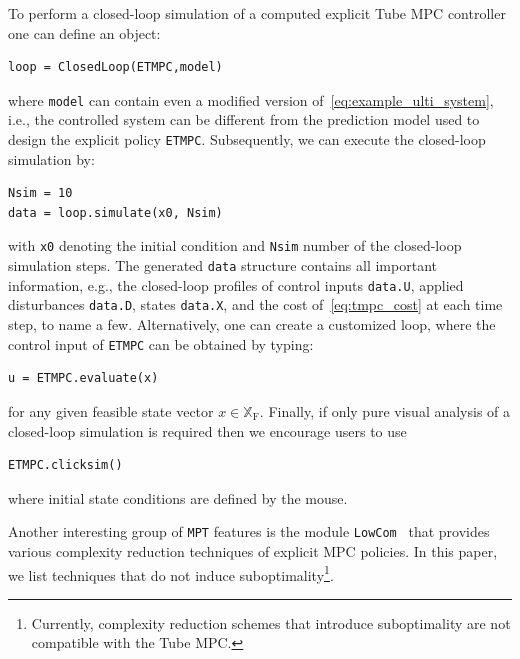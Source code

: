 \documentclass[letterpaper, 10 pt, conference]{ieeeconf}
\begin{document}
To perform a closed-loop simulation of a computed explicit Tube MPC controller one can define an object:
\begin{lstlisting}[style=Matlab-editor]
	loop = ClosedLoop(ETMPC,model)
\end{lstlisting}
where \verb|model| can contain even a modified version of~\eqref{eq:example_ulti_system}, i.e., the controlled system can be different from the prediction model used to design the explicit policy \verb|ETMPC|. Subsequently, we can execute the closed-loop simulation by:
\begin{lstlisting}[style=Matlab-editor]
Nsim = 10
data = loop.simulate(x0, Nsim)
\end{lstlisting}	
with \verb|x0| denoting the initial condition and \verb|Nsim| number of the closed-loop simulation steps. The generated \verb|data| structure contains all important information, e.g., the closed-loop profiles of control inputs \verb|data.U|, applied disturbances \verb|data.D|, states \verb|data.X|, and the cost of~\eqref{eq:tmpc_cost} at each time step, to name a few.
Alternatively, one can create a customized loop, where the control input of \verb|ETMPC| can be obtained by typing: 
\begin{lstlisting}[style=Matlab-editor]
u = ETMPC.evaluate(x)
\end{lstlisting}
for any given feasible state vector $x\in\mathbb{X}_{\mathrm{F}}$.
%
Finally, if only pure visual analysis of a closed-loop simulation is required then we encourage users to use
\begin{lstlisting}[style=Matlab-editor]
ETMPC.clicksim()
\end{lstlisting}
where initial state conditions are defined by the mouse.
%

Another interesting group of \texttt{MPT} features is the module \texttt{LowCom}~\cite{KH15} that provides various complexity reduction techniques of explicit MPC policies. In this paper, we list techniques that do not induce suboptimality\footnote{Currently, complexity reduction schemes that introduce suboptimality are not compatible with the Tube MPC.}.
\end{document}
